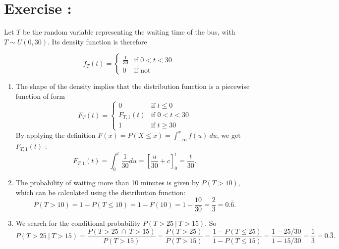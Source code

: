 \documentclass[12pt,thmsa]{article}\usepackage[]{graphicx}\usepackage[]{color}
\begin{document}
\bigskip


\addtocounter{section}{1}
\section*{Exercise \thesection:}

Let $T$ be the random variable representing the waiting time of the bus, with $T \sim U(0,30)$. Its density function is therefore

\begin{equation*}
  f_T(t) = \left\{
    \begin{array}{ll}
      \frac{1}{30} & \text{if } 0 < t < 30 \\
      0 & \text{if not}
    \end{array}
  \right.
\end{equation*}
\medskip

\begin{enumerate}%
\item The shape of the density implies that the distribution function is a piecewise function of form
  \begin{equation*}
    F_T(t) = \left\{
      \begin{array}{ll}
        0 & \text{if } t \le 0 \\
        F_{T,1}(t) & \text{if } 0 < t < 30 \\
        1 & \text{if } t \ge 30
      \end{array}
      \right.
  \end{equation*}
  By applying the definition $F(x)=P(X \le x)=\int_{-\infty}^x f(u)
  \ du$, we get $F_{T,1}(t)$ :
  \begin{equation*}
    F_{T,1}(t) =
    \int_{0}^{t} \frac{1}{30} du =
    \left[ \frac{u}{30} + c \right]^{t}_{0}
    = \frac{t}{30}.
  \end{equation*}
\item The probability of waiting more than 10 minutes is given by $P(T > 10)$, which can be calculated using the distribution function:
  \begin{equation*}
    P(T>10) = 1-P(T \le 10) = 1-F(10) = 1-\frac{10}{30} = \frac{2}{3}
    = {0.\bar{6}}.
  \end{equation*}
\item We search for the conditional probability
  $P(T>25 \ | \ T>15)$. So
  \begin{equation*}
    P(T>25 \ | \ T>15) = \frac{P(T>25 \ \cap \ T>15)}{P(T>15)} =
    \frac{P(T>25)}{P(T>15)} = \frac{1-P(T\le25)}{1-P(T\le15)} =
    \frac{1-25/30}{1-15/30} = \frac{1}{3} ={0.\bar{3}}.
  \end{equation*}
\end{enumerate}
\end{document}
